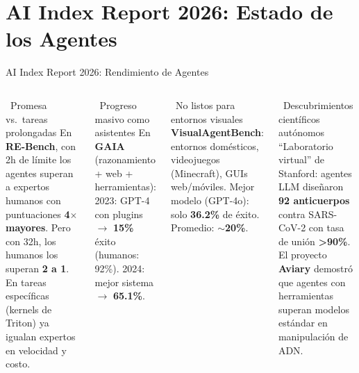 \documentclass[aspectratio=169]{beamer}
\begin{document}
\section{AI Index Report 2026: Estado de los Agentes}
\begin{frame}{AI Index Report 2026: Rendimiento de Agentes}
    \begin{columns}[t]
        \begin{block}{\faRocket\ Promesa vs.\ tareas prolongadas}
            \scriptsize
            En \textbf{RE-Bench}, con 2h de límite los agentes superan a expertos humanos con puntuaciones \textbf{4$\times$ mayores}. Pero con 32h, los humanos los superan \textbf{2 a 1}. En tareas específicas (kernels de Triton) ya igualan expertos en velocidad y costo.
        \end{block}
        
        \begin{block}{\faTasks\ Progreso masivo como asistentes}
            \scriptsize
            En \textbf{GAIA} (razonamiento + web + herramientas): 2023: GPT-4 con plugins $\rightarrow$ \textbf{15\%} éxito (humanos: 92\%). 2024: mejor sistema $\rightarrow$ \textbf{65.1\%}.
        \end{block}
        
        \begin{block}{\faDesktop\ No listos para entornos visuales}
            \scriptsize
            \textbf{VisualAgentBench}: entornos domésticos, videojuegos (Minecraft), GUIs web/móviles. Mejor modelo (GPT-4o): solo \textbf{36.2\%} de éxito. Promedio: \textbf{$\sim$20\%}.
        \end{block}
        
        \begin{block}{\faFlask\ Descubrimientos científicos autónomos}
            \scriptsize
            ``Laboratorio virtual'' de Stanford: agentes LLM diseñaron \textbf{92 anticuerpos} contra SARS-CoV-2 con tasa de unión \textbf{>90\%}. El proyecto \textbf{Aviary} demostró que agentes con herramientas superan modelos estándar en manipulación de ADN.
        \end{block}
    \end{columns}
\end{frame}
\end{document}
